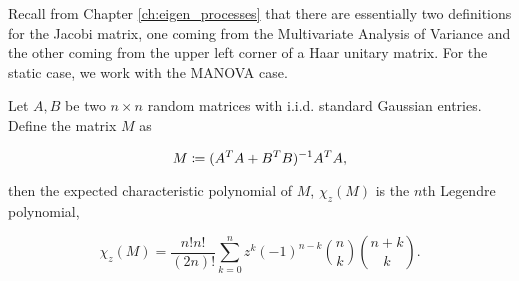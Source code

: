 Recall from Chapter \ref{ch:eigen_processes} that there are essentially two definitions for the Jacobi matrix, one coming from the Multivariate Analysis of Variance and the other coming from the upper left corner of a Haar unitary matrix. For the static case, we work with the MANOVA case. 

\begin{theorem}
    Let $A,B$ be two $n\times n$ random matrices with i.i.d. standard Gaussian entries. Define the matrix $M$ as

    \begin{equation*}
        M \coloneqq (A^TA + B^TB)^{-1}A^TA,
    \end{equation*}

    then the expected characteristic polynomial of $M$, $\chi_z(M)$ is the $n$th Legendre polynomial,

    \begin{equation*}
        \chi_z(M) = \frac{n!n!}{(2n)!}\sum_{k=0}^n z^k(-1)^{n-k} \binom nk \binom{n+k}k.
    \end{equation*}
\end{theorem}

